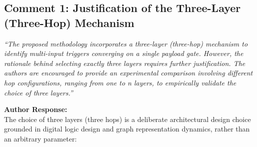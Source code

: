 \documentclass[11pt,a4paper]{article}
\newcommand{\reviewercomment}[1]{\vspace{4pt}\noindent\textcolor{revcomment}{\textit{``#1''}}\vspace{4pt}}
\newcommand{\authorresponse}{\noindent\textbf{Author Response:}}
\begin{document}
\subsection*{Comment 1: Justification of the Three-Layer (Three-Hop) Mechanism}

\reviewercomment{The proposed methodology incorporates a three-layer (three-hop) mechanism to identify multi-input triggers converging on a single payload gate. However, the rationale behind selecting exactly three layers requires further justification. The authors are encouraged to provide an experimental comparison involving different hop configurations, ranging from one to n layers, to empirically validate the choice of three layers.}

\authorresponse\\
The choice of three layers (three hops) is a deliberate architectural design choice grounded in digital logic design and graph representation dynamics, rather than an arbitrary parameter:
\end{document}
